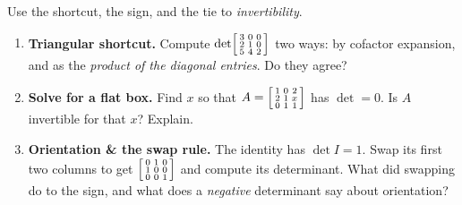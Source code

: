 \documentclass[10pt]{article}
\begin{document}
\begin{tcolorbox}[colback=white, colframe=black!40, title=\textbf{Tier A --- Approaching Proficiency},
    fonttitle=\bfseries, arc=1.5mm, left=3mm, right=3mm, top=2mm, bottom=2mm, breakable]
Use the shortcut, the sign, and the tie to \emph{invertibility}.
\begin{enumerate}[leftmargin=1.7em, itemsep=9pt]
  \item \textbf{Triangular shortcut.} Compute $\det\begin{bsmallmatrix} 3 & 0 & 0 \\ 2 & 1 & 0 \\ 5 & 4 & 2 \end{bsmallmatrix}$
        two ways: by cofactor expansion, and as the \emph{product of the diagonal entries}. Do they agree? 
  \item \textbf{Solve for a flat box.} Find $x$ so that $A=\begin{bsmallmatrix} 1 & 0 & 2 \\ 2 & 1 & x \\ 0 & 1 & 1 \end{bsmallmatrix}$
        has $\det=0$. Is $A$ invertible for that $x$? Explain. 
  \item \textbf{Orientation \& the swap rule.} The identity has $\det I=1$. Swap its first two columns to get
        $\begin{bsmallmatrix} 0 & 1 & 0 \\ 1 & 0 & 0 \\ 0 & 0 & 1 \end{bsmallmatrix}$ and compute its determinant.
        What did swapping do to the sign, and what does a \emph{negative} determinant say about orientation? 
\end{enumerate}
\end{tcolorbox}
\end{document}
